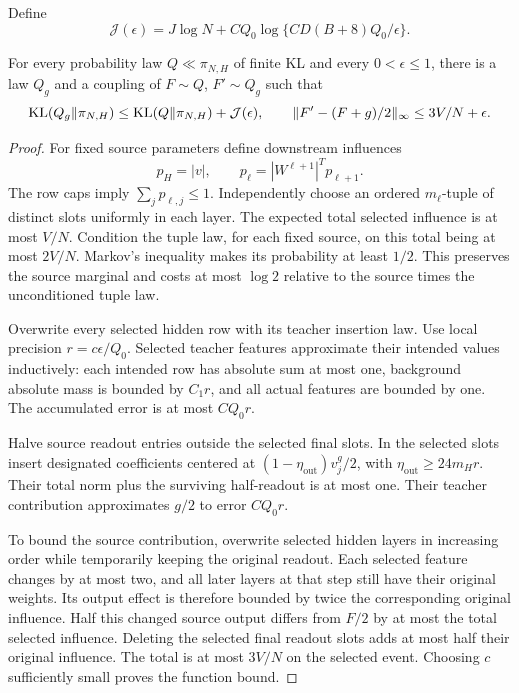 Define
\[
 \mathcal J(\epsilon)=J\log N+
 C Q_0\log\{CD(B+8)Q_0/\epsilon\}.
\]
\begin{lemma}
\label{lem:transfer}
For every probability law $Q\ll\pi_{N,H}$ of finite KL and every $0<\epsilon\le1$, there is a law $Q_g$ and a coupling of $F\sim Q$, $F'\sim Q_g$ such that
\[
 \operatorname{KL}(Q_g\|\pi_{N,H})\le\operatorname{KL}(Q\|\pi_{N,H})+\mathcal J(\epsilon),
 \qquad
 \|F'-(F+g)/2\|_\infty\le3V/N+\epsilon.
\]
\end{lemma}
\begin{proof}
For fixed source parameters define downstream influences
\[
 p_H=|v|,\qquad p_\ell=|W^{\ell+1}|^T p_{\ell+1}.
\]
The row caps imply $\sum_jp_{\ell,j}\le1$. Independently choose an ordered $m_\ell$-tuple of distinct slots uniformly in each layer. The expected total selected influence is at most $V/N$. Condition the tuple law, for each fixed source, on this total being at most $2V/N$. Markov's inequality makes its probability at least $1/2$. This preserves the source marginal and costs at most $\log2$ relative to the source times the unconditioned tuple law.

Overwrite every selected hidden row with its teacher insertion law. Use local precision $r=c\epsilon/Q_0$. Selected teacher features approximate their intended values inductively: each intended row has absolute sum at most one, background absolute mass is bounded by $C_1r$, and all actual features are bounded by one. The accumulated error is at most $CQ_0r$.

Halve source readout entries outside the selected final slots. In the selected slots insert designated coefficients centered at $(1-\eta_\mathrm{out})v^g_j/2$, with $\eta_\mathrm{out}\ge24m_Hr$. Their total norm plus the surviving half-readout is at most one. Their teacher contribution approximates $g/2$ to error $CQ_0r$.

To bound the source contribution, overwrite selected hidden layers in increasing order while temporarily keeping the original readout. Each selected feature changes by at most two, and all later layers at that step still have their original weights. Its output effect is therefore bounded by twice the corresponding original influence. Half this changed source output differs from $F/2$ by at most the total selected influence. Deleting the selected final readout slots adds at most half their original influence. The total is at most $3V/N$ on the selected event. Choosing $c$ sufficiently small proves the function bound.


\end{proof}

